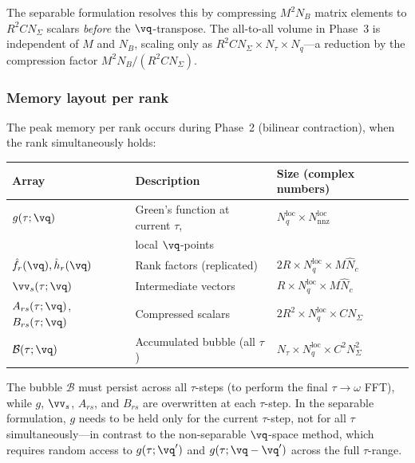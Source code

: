 The separable formulation resolves this by compressing
$M^2 N_B$ matrix elements to $R^2 C N_\Sigma$ scalars
\emph{before} the $\vq$-transpose.  The all-to-all volume in
Phase~3 is independent of $M$ and $N_B$, scaling only as
$R^2 C N_\Sigma \times N_\tau \times N_q$---a reduction by
the compression factor $M^2 N_B / (R^2 C N_\Sigma)$.

\subsubsection{Memory layout per rank}
\label{sssub:memory}

The peak memory per rank occurs during Phase~2 (bilinear
contraction), when the rank simultaneously holds:
\begin{center}
\begin{tabular}{lll}
  \toprule
  Array & Description & Size (complex numbers) \\
  \midrule
  $g(\tau;\vq)$
    & Green's function at current $\tau$,
    & $N_q^{\mathrm{loc}} \times N_{\mathrm{nnz}}^{\mathrm{loc}}$ \\
    & local $\vq$-points & \\[4pt]
  $\hat{f}_r(\vq), \hat{h}_r(\vq)$
    & Rank factors (replicated)
    & $2R \times N_q^{\mathrm{loc}} \times M\hat{N}_c$ \\[4pt]
  $\vv_s(\tau;\vq)$
    & Intermediate vectors
    & $R \times N_q^{\mathrm{loc}} \times M\hat{N}_c$ \\[4pt]
  $A_{rs}(\tau;\vq)$, $B_{rs}(\tau;\vq)$
    & Compressed scalars
    & $2R^2 \times N_q^{\mathrm{loc}} \times C N_\Sigma$ \\[4pt]
  $\mathcal{B}(\tau;\vq)$
    & Accumulated bubble (all $\tau$)
    & $N_\tau \times N_q^{\mathrm{loc}} \times C^2 N_\Sigma^2$ \\
  \bottomrule
\end{tabular}
\end{center}
The bubble $\mathcal{B}$ must persist across all $\tau$-steps
(to perform the final $\tau\to\omega$ FFT), while $g$,
$\vv_s$, $A_{rs}$, and $B_{rs}$ are overwritten at each
$\tau$-step.  In the separable formulation, $g$ needs to be
held only for the current $\tau$-step, not for all $\tau$
simultaneously---in contrast to the non-separable $\vq$-space
method, which requires random access to $g(\tau;\vq')$ and
$g(\tau;\vq-\vq')$ across the full $\tau$-range.

